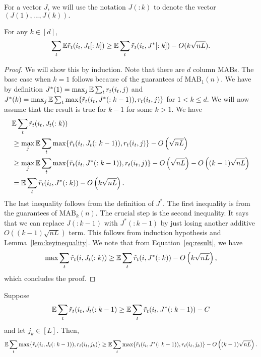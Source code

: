 For a vector $J$, we will use the notation $J(:k)$ to denote the vector $(J(1),...,J(k)).$
\begin{lemma}
\label{lem:keylem}

For any $k \in [d]$,
$$ \sum_t \mathbb{E} \tilde{r}_t(i_t, J_t[:k]) \geq  \mathbb{E} \sum_t \tilde{r}_t(i_t, J^*[:k]) - O(k\sqrt{nL}).$$ 

\end{lemma}
\begin{proof}
We will show this by induction. Note that there are $d$ column MABs. The base case when $k=1$ follows because of the guarantees of MAB$_1(n)$.
We have by definition $J^*(1) = \max_j   \mathbb{E} \sum_t  {r}_t(i_t, j) $ and $J^*(k) = \max_{j} \mathbb{E} \sum_t   \max \{  \tilde{r}_t(i_t, J^*(:k-1)), r_t(i_t,j) \}$ for $1 < k \leq d$.   We will now assume that the result is true for $k-1$ for some $k>1.$
We have 
\begin{align}
& \mathbb{E}  \sum_t \tilde{r}_t(i_t, J_t(:k))   \\
&\geq \max_{j} \mathbb{E} \sum_t   \max \{ \tilde{r}_t(i_t, J_t(:k-1)), r_t(i_t,j) \}  - O\left(\sqrt{nL}\right) \\
&\geq \max_{j} \mathbb{E} \sum_t   \max \{  \tilde{r}_t(i_t, J^*(:k-1)), r_t(i_t,j) \}   - O\left( \sqrt{nL} \right) - O\left( (k-1)\sqrt{nL} \right)   \\
\label{eq:result}
& =  \mathbb{E} \sum_t  \tilde{r}_t(i_t, J^*(:k))  - O\left( k\sqrt{nL} \right).
\end{align}
The last inequality follows from the definition of $J^*.$
The first inequality is from the guarantees of MAB$_k(n)$.  The crucial step is  the second inequality. It says that we can replace $J(:k-1)$ with $J^*(:k-1)$ by just losing another additive $O\left( (k-1) \sqrt{nL} \right)$ term. This follows from induction hypothesis and Lemma~\ref{lem:keyinequality}. We note that from Equation~\ref{eq:result}, we have
$$ \max  \sum_t \tilde{r}_t(i, J_t(:k))  \geq  \mathbb{E} \sum_t \tilde{r}_t(i, J^*(:k))  - O\left( k \sqrt{nL} \right),$$
which concludes the proof.
\end{proof}


\begin{lemma}
\label{lem:keyinequality}
Suppose
 $$ \mathbb{E} \sum_t \tilde{r}_t(i_t, J_t(:k-1) \geq  \mathbb{E} \sum_t \tilde{r}_t(i_t, J^*(:k-1))  - C$$
  and let $j_k \in [L].$ Then,
$$ \mathbb{E} \sum_t \max \{ \tilde{r}_t(i_t, J_t(:k-1)), r_t(i_t,j_k) \} \geq \mathbb{E} \sum_t  \max \{ \tilde{r}_t(i_t, J^*(:k-1)), r_t(i_t,j_k) \} - O\left((k-1) \sqrt{nL} \right).$$
\end{lemma}

